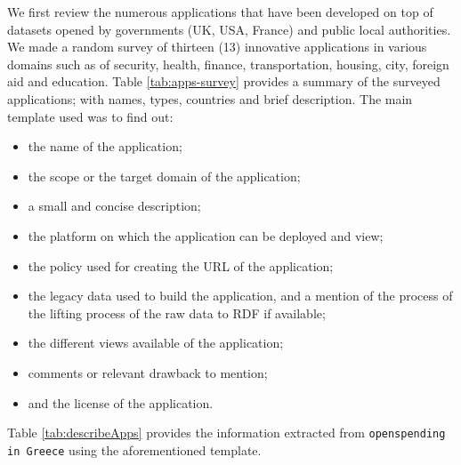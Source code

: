 We first review the numerous applications that have been developed on top of datasets  opened by governments (UK, USA, France) and public local authorities. We made a random survey of thirteen (13) innovative applications \cite{deliverable2012a} in various domains such as of security, health, finance, transportation, housing, city, foreign aid and education. Table \ref{tab:apps-survey} provides a summary of the surveyed applications; with names, types, countries and brief description. 
The main template used was to find out:
\begin{itemize}
\item the name of the application;
\item the scope or the target domain of the application;
\item a small and concise description;
\item the platform on which the application can be deployed and view;
\item the policy used for creating the URL of the application;
\item the legacy data used to build the application, and a mention of the process of the lifting process of the raw data to RDF if available;
\item the different views available of the application;
\item comments or relevant drawback to mention;
\item and the license of the application.
\end{itemize}
 Table \ref{tab:describeApps} provides the information extracted from \texttt{openspending in Greece} using the aforementioned template. 


